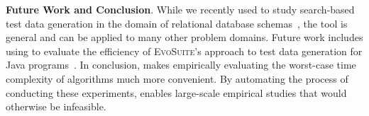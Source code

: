 
{\bf Future Work and Conclusion}.  While we recently used \toolname to
study search-based test data generation in the domain of relational
database schemas~\cite{kinneer2015}, the tool is general and can be
applied to many other problem domains. Future work includes using \toolname
to evaluate the efficiency of \textsc{EvoSuite}'s approach to test data
generation for Java programs~\cite{fraser2013}.  In conclusion,
\toolname makes empirically evaluating the worst-case time complexity of
algorithms much more convenient.  By automating the process of
conducting these experiments, \toolname enables large-scale empirical
studies that would otherwise be infeasible.


